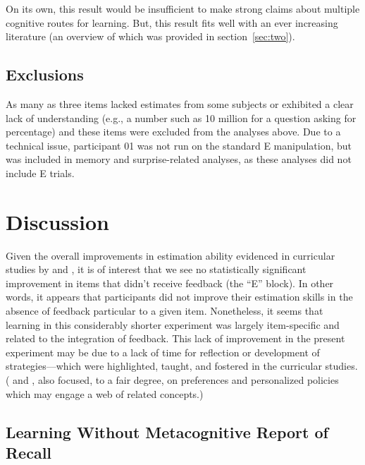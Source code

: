 On its own, this result would be insufficient to make strong claims about
multiple cognitive routes for learning. But, this result fits well with an ever
increasing literature (an overview of which was provided in
section~\ref{sec:two}).

\subsection{Exclusions}

As many as three items lacked estimates from some subjects or exhibited a clear
lack of understanding (e.g., a number such as 10 million for a question asking
for percentage) and these items were excluded from the analyses above. Due to a
technical issue, participant 01 was not run on the standard E manipulation, but
was included in memory and surprise-related analyses, as these analyses did not
include E trials.

\section{Discussion}

Given the overall improvements in estimation ability evidenced in curricular
studies by \textcite{munnich_numerically-driven_2004} and
\textcite{ranney_designing_2008}, it is of interest that we see no statistically
significant improvement in items that didn't receive feedback (the ``E'' block).
In other words, it appears that participants did not improve their estimation
skills in the absence of feedback particular to a given item.
Nonetheless, it seems that learning in this considerably shorter experiment was
largely item-specific and related to the integration of feedback. This lack of
improvement in the present experiment may be due to a lack of time for
reflection or development of strategies––which were highlighted, taught, and
fostered in the curricular studies.
( and , also focused, to
a fair degree, on preferences and personalized policies which may engage a web
of related concepts.)

\subsection{Learning Without Metacognitive Report of Recall}

